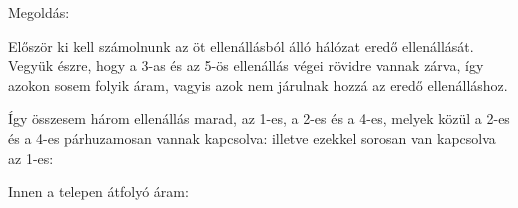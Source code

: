
\ifdefined\megoldas
 
 Megoldás: 

 Először ki kell számolnunk az öt ellenállásból álló hálózat eredő ellenállását. Vegyük észre, hogy a 3-as és az 5-ös ellenállás végei rövidre vannak zárva, így azokon sosem folyik áram, vagyis azok nem járulnak hozzá az eredő ellenálláshoz. 

 Így összesem három ellenállás marad, az 1-es, a 2-es és a 4-es, melyek közül a 2-es és a 4-es párhuzamosan vannak kapcsolva:
 illetve ezekkel sorosan van kapcsolva az 1-es:

 Innen a telepen átfolyó áram:

\fi